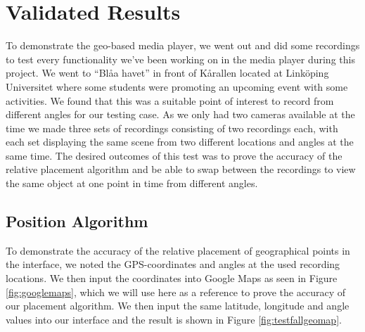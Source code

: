 \chapter{Validated Results}
\label{cha:results}

To demonstrate the geo-based media player, we went out and did some recordings to test every functionality we’ve been working on in the media player during this project. We went to “Blåa havet” in front of Kårallen located at Linköping Universitet where some students were promoting an upcoming event with some activities. We found that this was a suitable point of interest to record from different angles for our testing case. As we only had two cameras available at the time we made three sets of recordings consisting of two recordings each, with each set displaying the same scene from two different locations and angles at the same time. The desired outcomes of this test was to prove the accuracy of the relative placement algorithm and be able to swap between the recordings to view the same object at one point in time from different angles.

\section{Position Algorithm}
\label{sec:positionalgorithm}

To demonstrate the accuracy of the relative placement of geographical points in the interface, we noted the GPS-coordinates and angles at the used recording locations. We then input the coordinates into Google Maps as seen in Figure \ref{fig:googlemaps}, which we will use here as a reference to prove the accuracy of our placement algorithm. We then input the same latitude, longitude and angle values into our interface and the result is shown in Figure \ref{fig:testfallgeomap}.


